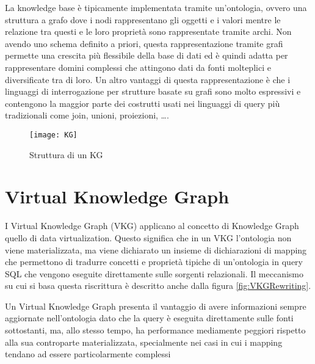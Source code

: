 La knowledge base è tipicamente implementata tramite un'ontologia, ovvero una struttura a grafo dove i nodi rappresentano gli oggetti e i valori mentre le relazione tra questi 
e le loro proprietà sono rappresentate tramite archi. Non avendo uno schema definito a priori, questa rappresentazione tramite grafi permette una crescita più flessibile della base di dati ed è quindi adatta
per rappresentare domini complessi che attingono dati da fonti molteplici e diversificate tra di loro. Un altro vantaggi di questa rappresentazione è che i linguaggi di interrogazione per strutture basate su grafi 
sono molto espressivi e contengono la maggior parte dei costrutti usati nei linguaggi di query più tradizionali come join, unioni, proiezioni, \dots \cite{KGIntro}.


\begin{figure}[ht]
    \centering
    \texttt{[image: KG]}
    \caption{Struttura di un KG \cite{KGDefinition}}
    \label{fig:KG}
\end{figure}


\section{Virtual Knowledge Graph}
\label{sec:vkg_description}
I Virtual Knowledge Graph (VKG) applicano al concetto di Knowledge Graph quello di data virtualization. Questo significa che in un VKG l'ontologia non viene materializzata, ma viene dichiarato un insieme di dichiarazioni 
di mapping che permettono di tradurre concetti e proprietà tipiche di un'ontologia in query SQL che vengono eseguite direttamente sulle sorgenti relazionali. Il meccanismo su cui si basa questa riscrittura è descritto 
anche dalla figura \ref{fig:VKGRewriting}.

Un Virtual Knowledge Graph presenta il vantaggio di avere informazioni sempre aggiornate nell'ontologia dato che la query è eseguita direttamente sulle fonti sottostanti, ma, allo stesso tempo, ha performance 
mediamente peggiori rispetto alla sua controparte materializzata, specialmente nei casi in cui i mapping tendano ad essere particolarmente complessi \cite{VKGMedical}

